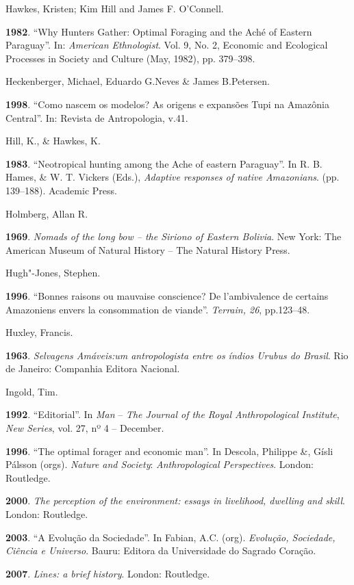 Hawkes, Kristen; Kim Hill and James F. O'Connell.

\textbf{1982}. ``Why Hunters Gather: Optimal Foraging and the Aché of
Eastern Paraguay''. In: \emph{American Ethnologist}. Vol. 9, No. 2,
Economic and Ecological Processes in Society and Culture (May, 1982),
pp. 379--398.

Heckenberger, Michael, Eduardo G.Neves \& James B.Petersen.

\textbf{1998}. ``Como nascem os modelos? As origens e expansões Tupi na
Amazônia Central''. In: Revista de Antropologia, v.41.

Hill, K., \& Hawkes, K.

\textbf{1983}. ``Neotropical hunting among the Ache of eastern
Paraguay''. In R. B. Hames, \& W. T. Vickers (Eds.), \emph{Adaptive
responses of native Amazonians}. (pp. 139--188). Academic Press.

Holmberg, Allan R.

\textbf{1969}. \emph{Nomads of the long bow -- the Siriono of Eastern
Bolivia}. New York: The American Museum of Natural History -- The
Natural History Press.

Hugh"-Jones, Stephen.

\textbf{1996}. ``Bonnes raisons ou mauvaise conscience? De l'ambivalence
de certains Amazoniens envers la consommation de viande''. \emph{Terrain,
26}, pp.123--48.

Huxley, Francis.

\textbf{1963}. \emph{Selvagens Amáveis:um antropologista entre os índios
Urubus do Brasil}. Rio de Janeiro: Companhia Editora Nacional.

Ingold, Tim.

\textbf{1992}. ``Editorial''. In \emph{Man} -- \emph{The Journal of the
Royal Anthropological Institute}, \emph{New Series}, vol. 27, nº 4 --
December.

\textbf{1996}. ``The optimal forager and economic man''. In Descola,
Philippe \&, Gísli Pálsson (orgs). \emph{Nature and Society}:
\emph{Anthropological Perspectives}. London: Routledge.

\textbf{2000}. \emph{The perception of the environment: essays in
livelihood, dwelling and skill}. London: Routledge.

\textbf{2003}. ``A Evolução da Sociedade''. In Fabian, A.C. (org).
\emph{Evolução, Sociedade, Ciência e Universo}. Bauru: Editora da
Universidade do Sagrado Coração.

\textbf{2007}. \emph{Lines: a brief history}. London: Routledge.

